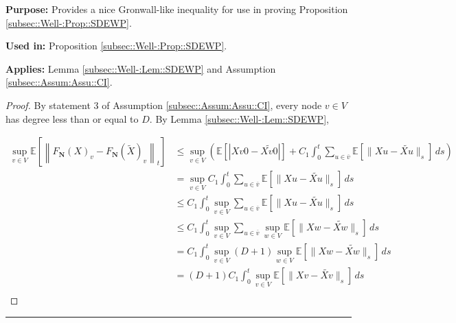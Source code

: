 \documentclass[12pt]{article}
\newcommand{\mb}{\mathbb}
\newcommand{\ov}{\overline}
\newcommand{\purpose}{\textbf{Purpose: }}
\newcommand{\usein}{\textbf{Used in: }}
\newcommand{\app}{\textbf{Applies: }}
\newcommand{\lin}{\rule{\linewidth}{0.4 pt}}
\newcommand{\ex}[1]{\mb{E}\left[#1\right]}			%
\renewcommand{\v}{v}							%
\newcommand{\vv}{u}								%
\newcommand{\vvv}{w}							%
\renewcommand{\t}{t}							%
\renewcommand{\tt}{s}							%
\newcommand{\X}{X}								%
\newcommand{\cl}{\ov}							%
\newcommand{\degr}{D}								%
\newcommand{\poisses}{\mathbf{N}}				%
\newcommand{\const}[1]{C_{#1}}						%
\newcommand{\alt}{\widetilde}						%
\begin{document}
\purpose Provides a nice Gronwall-like inequality for use in proving Proposition \ref{subsec::Well-:Prop::SDEWP}.

\usein Proposition \ref{subsec::Well-:Prop::SDEWP}.

\app Lemma \ref{subsec::Well-:Lem::SDEWP} and Assumption \ref{subsec::Assum:Assu::CI}.

\begin{proof}
By statement 3 of Assumption \ref{subsec::Assum:Assu::CI}, every node \(v \in V\) has degree less than or equal to \(\degr\). By Lemma \ref{subsec::Well-:Lem::SDEWP},

\begin{align*}
\sup_{\v \in  V} \ex{\left\|F_\poisses(\X{}{})_\v - F_\poisses(\alt{\X{}{}})_\v\right\|_\t} &\leq \sup_{\v\in  V}\left(\ex{|\X{\v}{0} - \alt{\X{\v}{0}}|} +  \const{1}\int_0^\t \sum_{\vv\in \cl{\v}} \ex{\|\X{\vv} - \alt{\X{\vv}{}}\|_\tt}\,d\tt\right)\\
&=\sup_{\v \in  V} \const{1}\int_0^\t \sum_{\vv \in \cl{\v}} \ex{\|\X{\vv} - \alt{\X{\vv}{}}\|_\tt}\,d\tt\\
&\leq \const{1}\int_0^\t \sup_{\v \in  V}\sum_{\vv \in \cl{\v}} \ex{\|\X{\vv} - \alt{\X{\vv}{}}\|_\tt}\,d\tt\\
&\leq \const{1}\int_0^\t \sup_{\v \in  V}\sum_{\vv \in \cl{\v}}\sup_{\vvv\in V} \ex{\|\X{\vvv} - \alt{\X{\vvv}{}}\|_\tt}\,d\tt\\
&= \const{1}\int_0^\t \sup_{\v \in  V}(\degr+1)\sup_{\vvv\in V} \ex{\|\X{\vvv} - \alt{\X{\vvv}{}}\|_\tt}\,d\tt\\
&= (\degr+1)\const{1}\int_0^\t \sup_{\v\in V} \ex{\|\X{\v} - \alt{\X{\v}{}}\|_\tt}\,d\tt\\
\end{align*}
\end{proof}
\lin
\end{document}
